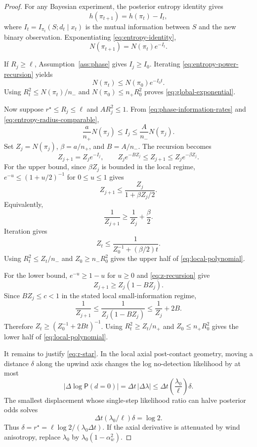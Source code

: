 \documentclass[11pt]{article}
\newcommand{\dt}{\Delta t}
\newcommand{\law}{\mathsf{P}}
\begin{document}
\begin{proof}
For any Bayesian experiment, the posterior entropy identity gives
\begin{equation}
        h(\pi_{t+1})=h(\pi_t)-I_t,
        \label{eq:entropy-identity}
\end{equation}
where $I_t=I_{\pi_t}(S;d_t\mid x_t)$ is the mutual information between $S$ and the new binary observation.  Exponentiating \eqref{eq:entropy-identity},
\begin{equation}
        N(\pi_{t+1})=N(\pi_t)e^{-I_t}.
        \label{eq:entropy-power-recursion}
\end{equation}

If $R_j\geq\ell$, Assumption~\ref{ass:phase} gives $I_j\geq I_0$.  Iterating \eqref{eq:entropy-power-recursion} yields
\[
        N(\pi_t)\leq N(\pi_0)e^{-I_0t}.
\]
Using $R_t^2\leq N(\pi_t)/n_-$ and $N(\pi_0)\leq n_+R_0^2$ proves \eqref{eq:global-exponential}.

Now suppose $r^\star\leq R_j\leq\ell$ and $AR_j^2\leq1$.  From \eqref{eq:phase-information-rates} and \eqref{eq:entropy-radius-comparable},
\[
        \frac{a}{n_+}N(\pi_j)\leq I_j\leq \frac{A}{n_-}N(\pi_j).
\]
Set $Z_j=N(\pi_j)$, $\beta=a/n_+$, and $B=A/n_-$.  The recursion becomes
\begin{equation}
        Z_{j+1}=Z_je^{-I_j},
        \qquad
        Z_je^{-BZ_j}\leq Z_{j+1}\leq Z_je^{-\beta Z_j}.
        \label{eq:z-recursion}
\end{equation}
For the upper bound, since $\beta Z_j$ is bounded in the local regime, $e^{-u}\leq(1+u/2)^{-1}$ for $0\leq u\leq1$ gives
\[
        Z_{j+1}\leq \frac{Z_j}{1+\beta Z_j/2}.
\]
Equivalently,
\[
        \frac{1}{Z_{j+1}}\geq \frac{1}{Z_j}+\frac{\beta}{2}.
\]
Iteration gives
\[
        Z_t\leq \frac{1}{Z_0^{-1}+(\beta/2)t}.
\]
Using $R_t^2\leq Z_t/n_-$ and $Z_0\geq n_-R_0^2$ gives the upper half of \eqref{eq:local-polynomial}.

For the lower bound, $e^{-u}\geq1-u$ for $u\geq0$ and \eqref{eq:z-recursion} give
\[
        Z_{j+1}\geq Z_j(1-BZ_j).
\]
Since $BZ_j\leq c<1$ in the stated local small-information regime,
\[
        \frac{1}{Z_{j+1}}
        \leq
        \frac{1}{Z_j(1-BZ_j)}
        \leq
        \frac{1}{Z_j}+2B .
\]
Therefore $Z_t\geq (Z_0^{-1}+2Bt)^{-1}$.  Using $R_t^2\geq Z_t/n_+$ and $Z_0\leq n_+R_0^2$ gives the lower half of \eqref{eq:local-polynomial}.

It remains to justify \eqref{eq:r-star}.  In the local axial post-contact geometry, moving a distance $\delta$ along the upwind axis changes the log no-detection likelihood by at most
\[
        |\Delta\log \law(d=0)|
        =
        \dt\,|\Delta\lambda|
        \leq
        \dt\left(\frac{\lambda_0}{\ell}\right)\delta .
\]
The smallest displacement whose single-step likelihood ratio can halve posterior odds solves
\[
        \dt(\lambda_0/\ell)\delta=\log 2.
\]
Thus $\delta=r^\star=\ell\log2/(\lambda_0\dt)$.  If the axial derivative is attenuated by wind anisotropy, replace $\lambda_0$ by $\lambda_0(1-\alpha_w^2)$.
\end{proof}
\end{document}
